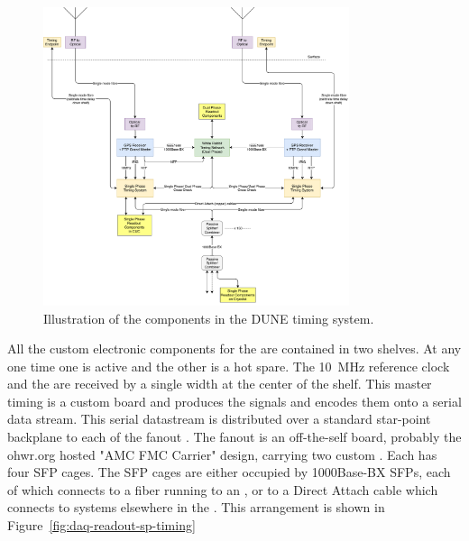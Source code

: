 \documentclass{article}
\begin{document}
\begin{figure}[H]
\includegraphics[width=0.8\textwidth]{daq-timing-block-diagram-tdr_2nov18.pdf}
\caption{Illustration of the components in the DUNE timing system.}
\label{fig:daq-readout-timing}
\end{figure}


All the custom electronic components for the  are contained in two
 shelves. At any one time one is active and the other is a
hot spare. The \SI{10}{\MHz} reference clock and the  are received
by a single width  at the center of the  shelf. This
master timing  is a custom board and produces the  signals and encodes them onto a
serial data stream. This serial datastream is distributed over a
standard star-point backplane to each of the fanout . The fanout  is an off-the-self board, probably the ohwr.org hosted "AMC FMC Carrier" design, carrying two custom . Each  has four SFP cages. The SFP cages are either occupied by
1000Base-BX SFPs, each of which connects to a fiber running to an ,
or to a Direct Attach cable which connects to systems elsewhere in the
. This
arrangement is shown in Figure~\ref{fig:daq-readout-sp-timing}


\end{document}
